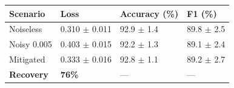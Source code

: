 \begin{tabular}{llll}
\toprule
Scenario & Loss & Accuracy (\%) & F1 (\%) \\
\midrule
Noiseless & 0.310 $\pm$ 0.011 & 92.9 $\pm$ 1.4 & 89.8 $\pm$ 2.5 \\
Noisy 0.005 & 0.403 $\pm$ 0.015 & 92.2 $\pm$ 1.3 & 89.1 $\pm$ 2.4 \\
Mitigated & 0.333 $\pm$ 0.016 & 92.8 $\pm$ 1.1 & 89.2 $\pm$ 2.7 \\
\textbf{Recovery} & \textbf{76\%} & --- & --- \\
\bottomrule
\end{tabular}
